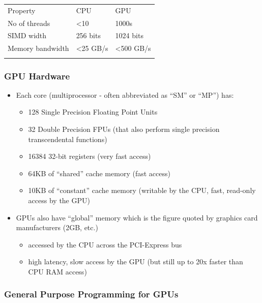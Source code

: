 \begin{longtable}[c]{@{}lll@{}}
\toprule\addlinespace
Property & CPU & GPU
\\\addlinespace
\midrule\endhead
No of threads & \textless{}10 & 1000s
\\\addlinespace
SIMD width & 256 bits & 1024 bits
\\\addlinespace
Memory bandwidth & \textless{}25 GB/s & \textless{}500 GB/s
\\\addlinespace
\bottomrule
\end{longtable}

\subsubsection{GPU Hardware}\label{gpu-hardware}

\begin{itemize}
\itemsep1pt\parskip0pt
\item
  Each core (multiprocessor - often abbreviated as ``SM'' or ``MP'')
  has:

  \begin{itemize}
  \itemsep1pt\parskip0pt
  \item
    128 Single Precision Floating Point Units
  \item
    32 Double Precision FPUs (that also perform single precision
    transcendental functions)
  \item
    16384 32-bit registers (very fast access)
  \item
    64KB of ``shared'' cache memory (fast access)
  \item
    10KB of ``constant'' cache memory (writable by the CPU, fast,
    read-only access by the GPU)
  \end{itemize}
\item
  GPUs also have ``global'' memory which is the figure quoted by
  graphics card manufacturers (2GB, etc.)

  \begin{itemize}
  \itemsep1pt\parskip0pt
  \item
    accessed by the CPU across the PCI-Express bus
  \item
    high latency, slow access by the GPU (but still up to 20x faster
    than CPU RAM access)
  \end{itemize}
\end{itemize}

\subsubsection{General Purpose Programming for
GPUs}\label{general-purpose-programming-for-gpus}

